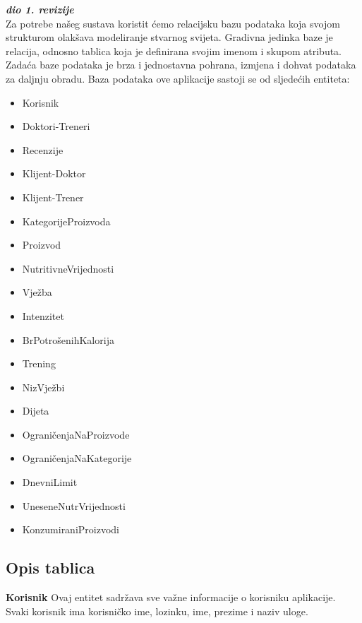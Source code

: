 			\textbf{\textit{dio 1. revizije}}\\
			Za potrebe našeg sustava koristit ćemo relacijsku bazu podataka koja svojom strukturom olakšava modeliranje stvarnog svijeta. Gradivna jedinka baze je relacija, odnosno tablica koja je definirana svojim imenom i skupom atributa. Zadaća baze podataka je brza i jednostavna pohrana, izmjena i dohvat podataka za daljnju obradu.
			Baza podataka ove aplikacije sastoji se od sljedećih entiteta:
			\begin{itemize}
				\item {Korisnik}
				\item {Doktori-Treneri}
				\item {Recenzije}
				\item {Klijent-Doktor}
				\item {Klijent-Trener}
				\item {KategorijeProizvoda}
				\item {Proizvod}
				\item {NutritivneVrijednosti}
				\item {Vježba}
				\item {Intenzitet}
				\item {BrPotrošenihKalorija}
				\item {Trening}
				\item {NizVježbi}
				\item {Dijeta}
				\item {OgraničenjaNaProizvode}
				\item {OgraničenjaNaKategorije}
				\item {DnevniLimit}
				\item {UneseneNutrVrijednosti}
				\item {KonzumiraniProizvodi}
			\end{itemize}
			
			
		
			\subsection{Opis tablica}
			

				\textbf{Korisnik} Ovaj entitet sadržava sve važne informacije o korisniku aplikacije. Svaki korisnik ima korisničko ime, lozinku, ime, prezime i naziv uloge. 
				
				
				
